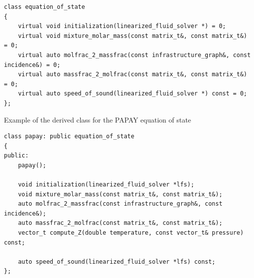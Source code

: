 \begin{verbatim}
class equation_of_state
{
    virtual void initialization(linearized_fluid_solver *) = 0; 
    virtual void mixture_molar_mass(const matrix_t&, const matrix_t&) = 0;
    virtual auto molfrac_2_massfrac(const infrastructure_graph&, const incidence&) = 0;
    virtual auto massfrac_2_molfrac(const matrix_t&, const matrix_t&) = 0;
    virtual auto speed_of_sound(linearized_fluid_solver *) const = 0;
};
\end{verbatim}
Example of the derived class for the PAPAY equation of state 
\begin{verbatim}
class papay: public equation_of_state
{
public:
    papay();
    
    void initialization(linearized_fluid_solver *lfs); 
    void mixture_molar_mass(const matrix_t&, const matrix_t&);
    auto molfrac_2_massfrac(const infrastructure_graph&, const incidence&);
    auto massfrac_2_molfrac(const matrix_t&, const matrix_t&);
    vector_t compute_Z(double temperature, const vector_t& pressure) const;

    auto speed_of_sound(linearized_fluid_solver *lfs) const;
};
\end{verbatim}
